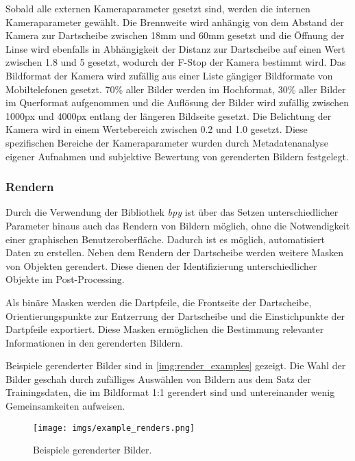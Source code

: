 Sobald alle externen Kameraparameter gesetzt sind, werden die internen Kameraparameter gewählt. Die Brennweite wird anhängig von dem Abstand der Kamera zur Dartscheibe zwischen 18mm und 60mm gesetzt und die Öffnung der Linse wird ebenfalls in Abhängigkeit der Distanz zur Dartscheibe auf einen Wert zwischen 1.8 und 5 gesetzt, wodurch der F-Stop der Kamera bestimmt wird. Das Bildformat der Kamera wird zufällig aus einer Liste gängiger Bildformate von Mobiltelefonen gesetzt. 70\% aller Bilder werden im Hochformat, 30\% aller Bilder im Querformat aufgenommen und die Auflösung der Bilder wird zufällig zwischen 1000px und 4000px entlang der längeren Bildseite gesetzt. Die Belichtung der Kamera wird in einem Wertebereich zwischen 0.2 und 1.0 gesetzt. Diese spezifischen Bereiche der Kameraparameter wurden durch Metadatenanalyse eigener Aufnahmen und subjektive Bewertung von gerenderten Bildern festgelegt.


\subsubsection{Rendern}
\label{sec:impl:daten:python:render}

Durch die Verwendung der Bibliothek \textit{bpy} ist über das Setzen unterschiedlicher Parameter hinaus auch das Rendern von Bildern möglich, ohne die Notwendigkeit einer graphischen Benutzeroberfläche. Dadurch ist es möglich, automatisiert Daten zu erstellen. Neben dem Rendern der Dartscheibe werden weitere Masken von Objekten gerendert. Diese dienen der Identifizierung unterschiedlicher Objekte im Post-Processing.

Als binäre Masken werden die Dartpfeile, die Frontseite der Dartscheibe, Orientierungspunkte zur Entzerrung der Dartscheibe und die Einstichpunkte der Dartpfeile exportiert. Diese Masken ermöglichen die Bestimmung relevanter Informationen in den gerenderten Bildern.

Beispiele gerenderter Bilder sind in \autoref{img:render_examples} gezeigt. Die Wahl der Bilder geschah durch zufälliges Auswählen von Bildern aus dem Satz der Trainingsdaten, die im Bildformat 1:1 gerendert sind und untereinander wenig Gemeinsamkeiten aufweisen.

\begin{figure}
    \centering
    \texttt{[image: imgs/example\_renders.png]}
    \caption{Beispiele gerenderter Bilder.}
    \label{img:render_examples}
\end{figure}

